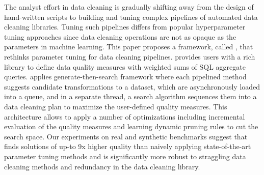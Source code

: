 \sloppy
The analyst effort in data cleaning is gradually shifting away from the design of hand-written scripts to building and tuning complex pipelines of automated data cleaning libraries.
Tuning such pipelines differs from popular hyperparameter tuning approaches since data cleaning operations are not as opaque as the parameters in machine learning. This paper proposes a framework, called \sys, that rethinks parameter tuning for data cleaning pipelines.
\sys provides users with a rich library to define data quality measures with weighted sums of SQL aggregate queries.
\sys applies generate-then-search framework where each pipelined method suggests candidate transformations to a dataset, which are asynchronously loaded into a queue, and in a separate thread, a search algorithm sequences them into a data cleaning plan to maximize the user-defined quality measures.
This architecture allows \sys to apply a number of optimizations including incremental evaluation of the quality measures and learning dynamic pruning rules to cut the search space.
Our experiments on real and synthetic benchmarks suggest that \sys finds solutions of up-to 9x higher quality than naively applying state-of-the-art parameter tuning methods and is significantly more robust to straggling data cleaning methods and redundancy in the data cleaning library.